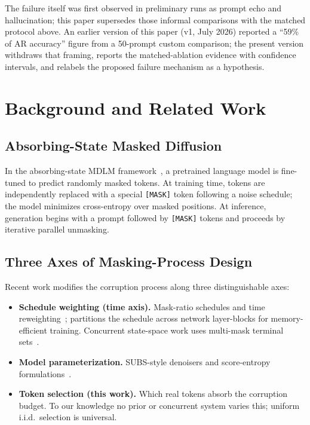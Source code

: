 \documentclass{article}
\begin{document}
The failure itself was first observed in preliminary runs as prompt echo and
hallucination; this paper supersedes those informal comparisons with the matched
protocol above. An earlier version of this paper (v1, July 2026) reported a
``59\% of AR accuracy'' figure from a 50-prompt custom comparison; the present version
withdraws that framing, reports the matched-ablation evidence with confidence
intervals, and relabels the proposed failure mechanism as a hypothesis.


\section{Background and Related Work}
\label{sec:background}

\subsection{Absorbing-State Masked Diffusion}

In the absorbing-state MDLM framework~\cite{sahoo2024mdlm}, a pretrained language model
is fine-tuned to predict randomly masked tokens. At training time, tokens are
independently replaced with a special \texttt{[MASK]} token following a noise schedule;
the model minimizes cross-entropy over masked positions. At inference, generation
begins with a prompt followed by \texttt{[MASK]} tokens and proceeds by iterative
parallel unmasking.

\subsection{Three Axes of Masking-Process Design}

Recent work modifies the corruption process along three distinguishable axes:

\begin{itemize}
    \item \textbf{Schedule weighting (time axis).} Mask-ratio schedules
    and time reweighting~\cite{sahoo2024mdlm,contextweighted2026};
    \cite{shing2026diffusionblocks} partitions the schedule across network
    layer-blocks for memory-efficient training. Concurrent state-space work uses
    multi-mask terminal sets~\cite{multimask2026}.
    \item \textbf{Model parameterization.} SUBS-style denoisers and score-entropy
    formulations~\cite{sahoo2024mdlm,meantoscore2026}.
    \item \textbf{Token selection (this work).} Which real tokens absorb the
    corruption budget. To our knowledge no prior or concurrent system varies this;
    uniform i.i.d.\ selection is universal.
\end{itemize}
\end{document}
